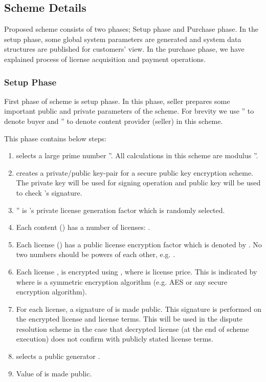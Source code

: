 \documentclass[times]{secauth}
\begin{document}
\subsection{Scheme Details}
\label{sec:scheme_details}
Proposed scheme consists of two phases; Setup phase and Purchase phase. In the setup phase, some global system parameters are generated and system data structures are published for customers' view. In the purchase phase, we have explained process of license acquisition and payment operations.

\subsubsection{Setup Phase}
First phase of scheme is setup phase. In this phase, seller prepares some important public and private parameters of the scheme. For brevity we use '' to denote buyer and '' to denote content provider (seller) in this scheme.

This phase contains below steps:

\begin{enumerate}
\item  selects a large prime number ''. All calculations in this scheme are modulus ''.
\item  creates a private/public key-pair for a secure public key encryption scheme. The private key will be used for signing operation and public key will be used to check 's signature.
\item '' is 's private license generation factor which is randomly selected.
\item Each content () has a number of licenses: .
\item Each license () has a public license encryption factor which is denoted by . No two  numbers should be powers of each other, e.g. .
\item Each license , is encrypted using , where  is license price. This is indicated by  where  is a symmetric encryption algorithm (e.g. AES or any secure encryption algorithm). 
\item For each license, a signature of  is made public. This signature is performed on the encrypted license and license terms. This will be used in the dispute resolution scheme in the case that decrypted license (at the end of scheme execution) does not confirm with publicly stated license terms. 
\item  selects a public generator .
\item Value of  is made public.
\end{enumerate}
	
\end{document}
